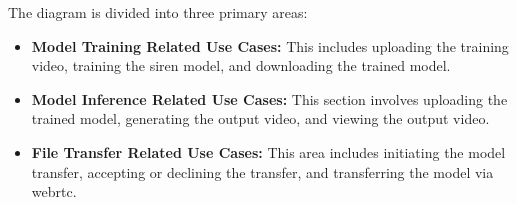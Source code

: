 The diagram is divided into three primary areas:

\begin{itemize}
    \item \textbf{Model Training Related Use Cases:} This includes uploading the training video, training the \gls{siren} model, and downloading the trained model.
    \item \textbf{Model Inference Related Use Cases:} This section involves uploading the trained model, generating the output video, and viewing the output video.
    \item \textbf{File Transfer Related Use Cases:} This area includes initiating the model transfer, accepting or declining the transfer, and transferring the model via \gls{webrtc}.
\end{itemize}
\pagebreak 
